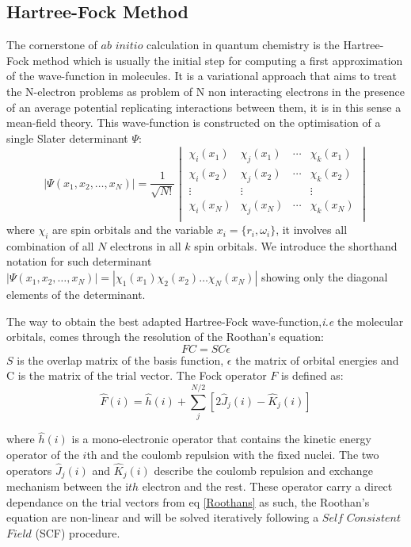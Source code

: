 \documentclass[10pt]{report}
\numberwithin{equation}{section}
\begin{document}
\subsection{Hartree-Fock Method}
The cornerstone of $ab$ $initio$ calculation in quantum chemistry is the Hartree-Fock method which is usually the initial step for computing a first approximation of the wave-function in molecules. 
It is a variational approach that aims to treat the N-electron problems as problem of N non interacting electrons in the presence of an average potential replicating interactions between them, it is in this sense a mean-field theory.
This wave-function is constructed on the optimisation of a single Slater determinant $\Psi$:
\begin{equation}
    |\Psi(x_1,x_2,\ldots,x_N)|=\frac{1}{\sqrt{N!}}
    \begin{vmatrix}
        \chi_i (x_1) & \chi_j (x_1) & \cdots & \chi_k (x_1)\\
        \chi_i (x_2) & \chi_j (x_2) & \cdots & \chi_k (x_2)\\
        \vdots & \vdots &   &  \vdots\\
        \chi_i (x_N) & \chi_j (x_N) & \cdots & \chi_k (x_N)\\
    \end{vmatrix}
\end{equation}
where $\chi_i$ are spin orbitals and the variable $x_i=\{r_i,\omega_i\}$, it involves all combination of all $N$ electrons in all $k$ spin orbitals. 
We introduce the shorthand notation for such determinant $|\Psi(x_1,x_2,\ldots,x_N)|=|\chi_1(x_1)\chi_2(x_2)\ldots\chi_N(x_N)|$ showing only the diagonal elements of the determinant.

The way to obtain the best adapted Hartree-Fock wave-function,\textit{i.e} the molecular orbitals, comes through the resolution of the Roothan's equation:
\begin{equation}\label{Roothans}
    FC=SC\epsilon
\end{equation}
$S$ is the overlap matrix of the basis function, $\epsilon$ the matrix of orbital energies and C is the matrix of the trial vector.
The Fock operator $F$ is defined as:
\begin{equation}
    \hat{F}(i)=\hat{h}(i)+\sum_{j}^{N/2}[2\hat{J}_{j}(i)-\hat{K}_{j}(i)]
\end{equation}

where $\hat{h}(i)$ is a mono-electronic operator that contains the kinetic energy operator of the $i$th and the coulomb repulsion with the fixed nuclei.
The two operators $\hat{J}_{j}(i)$ and $\hat{K}_{j}(i)$ describe the coulomb repulsion and exchange mechanism between the i$th$ electron and the rest.
These operator carry a direct dependance on the trial vectors from eq \ref{Roothans} as such, the Roothan's equation are non-linear and will be solved iteratively following a $Self$ $Consistent$ $Field$ (SCF) procedure.
\end{document}
